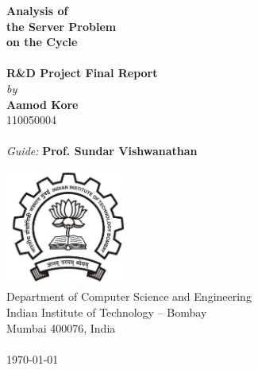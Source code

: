 \documentclass[11pt,letterpaper]{report}
\begin{document}

\begin{titlepage}
\begin{center}

{\Huge \bfseries
Analysis of \\
the Server Problem \\
on the Cycle  \\
}~\\[1.00cm]

{\large \bfseries
R\&D Project Final Report
}~\\[0.25cm]

{\large
\textit{by}
}~\\[0.25cm]

{\large
\textbf{Aamod Kore} \\
{{110050004}}\\
}~\\[0.5cm]

{\large
\textit{Guide:}
\textbf{Prof. Sundar Vishwanathan}\\
}

\vfill

\includegraphics[width=4cm]{img/iitb-logo-black.jpg}~\\[1cm]

{\large
Department of Computer Science and Engineering\\
Indian Institute of Technology -- Bombay\\
Mumbai 400076, India\\
}~\\[0.5cm]
{\large \today}
\end{center}
\end{titlepage}













{}


\end{document}
